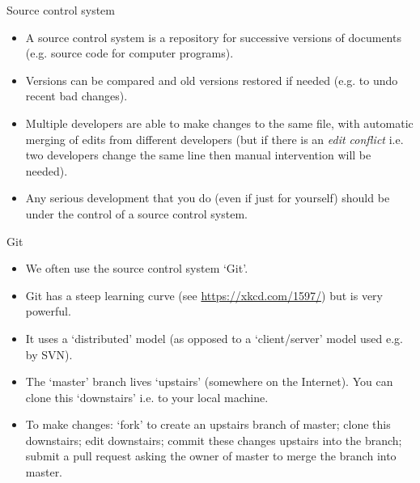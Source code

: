 \documentclass{beamer}
\begin{document}
\begin{frame}{Source control system}
  \begin{itemize}
    \item A source control system is a repository for successive versions of documents (e.g. source code for computer programs).
    \item Versions can be compared and old versions restored if needed (e.g. to undo recent bad changes).
    \item Multiple developers are able to make changes to the same file, with automatic merging of edits from different developers (but if there is an \textit{edit conflict} i.e. two developers change the same line then manual intervention will be needed).
    \item Any serious development that you do (even if just for yourself) should be under the control of a source control system.
  \end{itemize}
\end{frame}
    
\begin{frame}{Git}
  \begin{itemize}
    \item We often use the source control system `Git'.
    \item Git has a steep learning curve (see \url{https://xkcd.com/1597/}) but is very powerful.
    \item It uses a `distributed' model (as opposed to a `client/server' model used e.g. by SVN).
    \item The `master' branch lives `upstairs' (somewhere on the Internet). You can clone this `downstairs' i.e. to your local machine.
    \item To make changes: `fork' to create an upstairs branch of master; clone this downstairs; edit downstairs; commit these changes upstairs into the branch; submit a pull request asking the owner of master to merge the branch into master.
  \end{itemize}
\end{frame}
\end{document}
